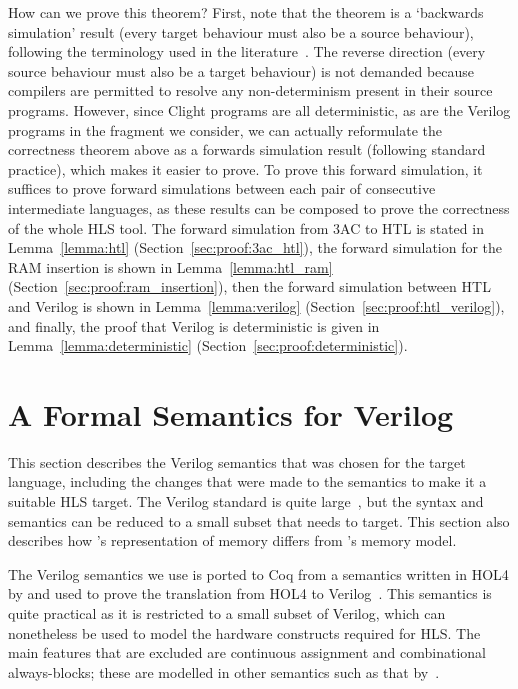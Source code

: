 How can we prove this theorem? First, note that the theorem is a `backwards
simulation' result (every target behaviour must also be a source behaviour),
following the terminology used in the \compcert{}
literature~\cite{leroy09_formal_verif_realis_compil}. The reverse direction
(every source behaviour must also be a target behaviour) is not demanded because
compilers are permitted to resolve any non-determinism present in their source
programs. However, since Clight programs are all deterministic, as are the
Verilog programs in the fragment we consider, we can actually reformulate the
correctness theorem above as a forwards simulation result (following standard
\compcert{} practice), which makes it easier to prove.  To prove this forward
simulation, it suffices to prove forward simulations between each pair of
consecutive intermediate languages, as these results can be composed to prove
the correctness of the whole HLS tool.  The forward simulation from 3AC to HTL
is stated in Lemma~\ref{lemma:htl} (Section~\ref{sec:proof:3ac_htl}), the
forward simulation for the RAM insertion is shown in Lemma~\ref{lemma:htl_ram}
(Section~\ref{sec:proof:ram_insertion}), then the forward simulation between HTL
and Verilog is shown in Lemma~\ref{lemma:verilog}
(Section~\ref{sec:proof:htl_verilog}), and finally, the proof that Verilog is
deterministic is given in Lemma~\ref{lemma:deterministic}
(Section~\ref{sec:proof:deterministic}).

\section{A Formal Semantics for Verilog}\label{sec:verilog}


\newcommand{\alwaysblock}{always-block}

This section describes the Verilog semantics that was chosen for the target language, including the changes that were made to the semantics to make it a suitable HLS target.  The Verilog standard is quite large~\cite{06_ieee_stand_veril_hardw_descr_languag,05_ieee_stand_veril_regis_trans_level_synth}, but the syntax and semantics can be reduced to a small subset that \vericert{} needs to target.  This section  also describes how \vericert{}'s representation of memory differs from \compcert{}'s memory model.

The Verilog semantics we use is ported to Coq from a semantics written in HOL4 by \textcite{loow19_proof_trans_veril_devel_hol} and used to prove the translation from HOL4 to Verilog~\cite{loow19_verif_compil_verif_proces}. %
This semantics is quite practical as it is restricted to a small subset of Verilog, which can nonetheless be used to model the hardware constructs required for HLS.  The main features that are excluded are continuous assignment and combinational \alwaysblock{}s; these are modelled in other semantics such as that by~\textcite{meredith10_veril}. %

